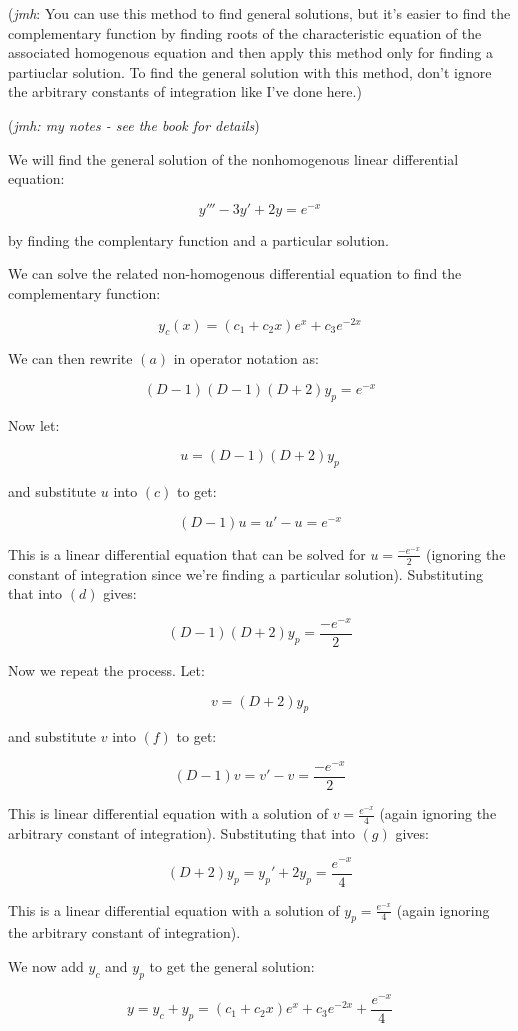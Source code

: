 \documentclass{article}
\begin{document}
(\emph{jmh}: You can use this method to find general solutions, but it's easier to find the complementary function by finding roots of the characteristic equation of the associated homogenous equation and then apply this method only for finding a partiuclar solution. To find the general solution with this method, don't ignore the arbitrary constants of integration like I've done here.)

(\emph{jmh: my notes - see the book for details})

We will find the general solution of the nonhomogenous linear differential equation:

\[ \tag{a} y''' - 3y' + 2y = e^{-x} \]

by finding the complentary function and a particular solution.

We can solve the related non-homogenous differential equation to find the complementary function:

\[ \tag{b} y_c (x) = (c_1 + c_2 x)e^x + c_3 e^{-2x} \]

We can then rewrite $(a)$ in operator notation as:

\[ \tag{c} (D-1)(D-1)(D+2)y_p = e^{-x} \]

Now let:

\[ \tag{d} u = (D-1)(D+2)y_p \]

and substitute $u$ into $(c)$ to get:

\[ \tag{e} (D-1)u = u' - u = e^{-x} \]

This is a linear differential equation that can be solved for $u = \frac{-e^{-x}}{2}$ (ignoring the constant of integration since we're finding a particular solution). Substituting that into $(d)$ gives:

\[ \tag{f} (D-1)(D+2)y_p = \frac{-e^{-x}}{2} \]

Now we repeat the process. Let:

\[ \tag{g} v = (D+2)y_p \]

and substitute $v$ into $(f)$ to get:

\[ \tag{h} (D-1)v = v' - v = \frac{-e^{-x}}{2} \]

This is linear differential equation with a solution of $v = \frac{e^{-x}}{4}$ (again ignoring the arbitrary constant of integration). Substituting that into $(g)$ gives:

\[ \tag{i} (D+2)y_p = y_p ' + 2y_p = \frac{e^{-x}}{4} \]

This is a linear differential equation with a solution of $y_p = \frac{e^{-x}}{4}$ (again ignoring the arbitrary constant of integration).

We now add $y_c$ and $y_p$ to get the general solution:

\[ \tag{j} y = y_c + y_p = (c_1 + c_2 x)e^x + c_3 e^{-2x} +  \frac{e^{-x}}{4} \]
\end{document}

